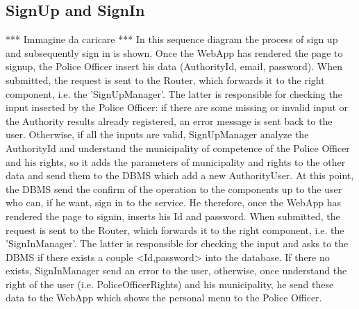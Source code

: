         \subsection{SignUp and SignIn}
        ***
        Immagine da caricare
        ***
        In this sequence diagram the process of sign up and subsequently sign in is shown. 
        Once the WebApp has rendered the page to signup, the Police Officer insert his data 
        (AuthorityId, email, password). When submitted, the request is sent to the Router, 
        which forwards it to the right component, i.e. the 'SignUpManager'. The latter is 
        responsible for checking the input inserted by the Police Officer: if there are some 
        missing or invalid input or the Authority results already registered, an error message 
        is sent back to the user. Otherwise, if all the inputs are valid, SignUpManager analyze 
        the AuthorityId and understand the municipality of competence of the Police Officer 
        and his rights, so it adds the parameters of municipality and rights to the other data 
        and send them to the DBMS which add a new AuthorityUser. At this point, the DBMS send 
        the confirm of the operation to the components up to the user who can, if he want, 
        sign in to the service. He therefore, once the WebApp has rendered the page to signin, 
        inserts his Id and password. When submitted, the request is sent to the Router, which 
        forwards it to the right component, i.e. the 'SignInManager'. The latter is responsible 
        for checking the input and asks to the DBMS if there exists a couple <Id,password> into 
        the database. If there no exists, SignInManager send an error to the user, otherwise, 
        once understand the right of the user (i.e. PoliceOfficerRights) and his municipality, 
        he send these data to the WebApp which shows the personal menu to the Police Officer. 


